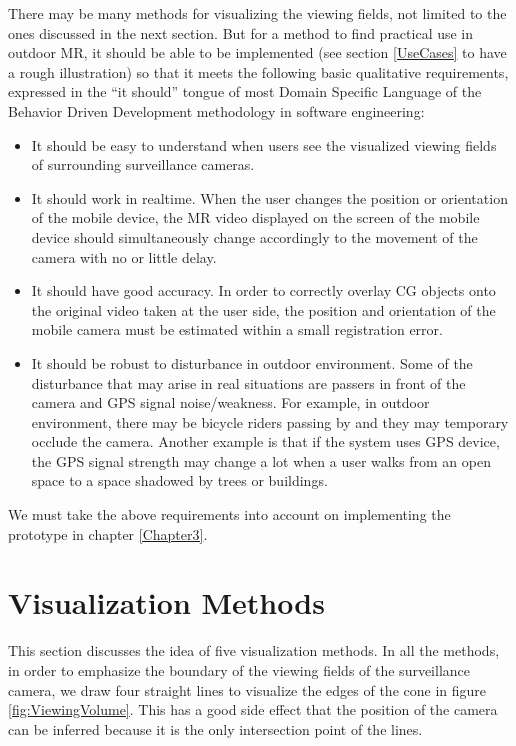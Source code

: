 There may be many methods for visualizing the viewing fields, not limited to the ones discussed in the next section. But for a method to find practical use in outdoor MR, it should be able to be implemented (see section \ref{UseCases} to have a rough illustration) so that it meets the following basic qualitative requirements, expressed in the ``it should'' tongue of most Domain Specific Language of the Behavior Driven Development methodology in software engineering:

\begin{itemize}
	\item It should be easy to understand when users see the visualized viewing fields of surrounding surveillance cameras.
	\item It should work in realtime. When the user changes the position or orientation of the mobile device, the MR video displayed on the screen of the mobile device should simultaneously change accordingly to the movement of the camera with no or little delay.
	\item It should have good accuracy. In order to correctly overlay CG objects onto the original video taken at the user side, the position and orientation of the mobile camera must be estimated within a small registration error.
	\item It should be robust to disturbance in outdoor environment. Some of the disturbance that may arise in real situations are passers in front of the camera and GPS signal noise/weakness. For example, in outdoor environment, there may be bicycle riders passing by and they may temporary occlude the camera. Another example is that if the system uses GPS device, the GPS signal strength may change a lot when a user walks from an open space to a space shadowed by trees or buildings.
\end{itemize}

We must take the above requirements into account on implementing the prototype in chapter \ref{Chapter3}.


\section{Visualization Methods}
\label{VisualizationMethods}

This section discusses the idea of five visualization methods. In all the methods, in order to emphasize the boundary of the viewing fields of the surveillance camera, we draw four straight lines to visualize the edges of the cone in figure \ref{fig:ViewingVolume}. This has a good side effect that the position of the camera can be inferred because it is the only intersection point of the lines.

